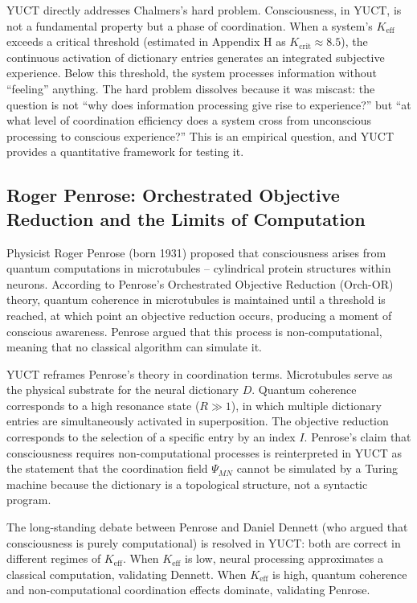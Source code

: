 \documentclass[12pt,a4paper]{article}
\begin{document}
	YUCT directly addresses Chalmers's hard problem. Consciousness, in YUCT, is not a fundamental property but a phase of coordination. When a system's \(K_{\mathrm{eff}}\) exceeds a critical threshold (estimated in Appendix H as \(K_{\mathrm{crit}} \approx 8.5\)), the continuous activation of dictionary entries generates an integrated subjective experience. Below this threshold, the system processes information without ``feeling'' anything. The hard problem dissolves because it was miscast: the question is not ``why does information processing give rise to experience?'' but ``at what level of coordination efficiency does a system cross from unconscious processing to conscious experience?'' This is an empirical question, and YUCT provides a quantitative framework for testing it.
	
	\subsection{Roger Penrose: Orchestrated Objective Reduction and the Limits of Computation}
	
	Physicist Roger Penrose (born 1931) proposed that consciousness arises from quantum computations in microtubules -- cylindrical protein structures within neurons. According to Penrose's Orchestrated Objective Reduction (Orch-OR) theory, quantum coherence in microtubules is maintained until a threshold is reached, at which point an objective reduction occurs, producing a moment of conscious awareness. Penrose argued that this process is non-computational, meaning that no classical algorithm can simulate it.
	
	YUCT reframes Penrose's theory in coordination terms. Microtubules serve as the physical substrate for the neural dictionary \(D\). Quantum coherence corresponds to a high resonance state (\(R \gg 1\)), in which multiple dictionary entries are simultaneously activated in superposition. The objective reduction corresponds to the selection of a specific entry by an index \(I\). Penrose's claim that consciousness requires non-computational processes is reinterpreted in YUCT as the statement that the coordination field \(\Psi_{MN}\) cannot be simulated by a Turing machine because the dictionary is a topological structure, not a syntactic program.
	
	The long-standing debate between Penrose and Daniel Dennett (who argued that consciousness is purely computational) is resolved in YUCT: both are correct in different regimes of \(K_{\mathrm{eff}}\). When \(K_{\mathrm{eff}}\) is low, neural processing approximates a classical computation, validating Dennett. When \(K_{\mathrm{eff}}\) is high, quantum coherence and non-computational coordination effects dominate, validating Penrose.
	
\end{document}
